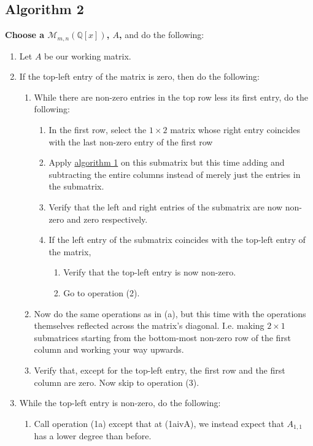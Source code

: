 \documentclass[twocolumn]{article}
\begin{document}
		\subsection{Algorithm 2}\label{sec:algorithm 2}
			\textbf{Choose a $\mathcal{M}_{m,n}(\mathbb{Q}[x])$, $A$,} and do the following:
			\begin{enumerate}
				\item Let $A$ be our working matrix.
				\item If the top-left entry of the matrix is zero, then do the following:
					\begin{enumerate}
						\item While there are non-zero entries in the top row less its first entry, do the following:
						\begin{enumerate}
							\item In the first row, select the $1\times 2$ matrix whose right entry coincides with the last non-zero entry of the first row
							\item Apply \hyperref[sec:algorithm 1]{algorithm 1} on this submatrix but this time adding and subtracting the entire columns instead of merely just the entries in the submatrix.
							\item Verify that the left and right entries of the submatrix are now non-zero and zero respectively.
							\item If the left entry of the submatrix coincides with the top-left entry of the matrix,
							\begin{enumerate}
								\item Verify that the top-left entry is now non-zero.
								\item Go to operation (2).
							\end{enumerate}
						\end{enumerate}
						\item Now do the same operations as in (a), but this time with the operations themselves reflected across the matrix's diagonal. I.e. making $2\times 1$ submatrices starting from the bottom-most non-zero row of the first column and working your way upwards.
						\item Verify that, except for the top-left entry, the first row and the first column are zero. Now skip to operation (3).
					\end{enumerate}
				\item While the top-left entry is non-zero, do the following:
					\begin{enumerate}
						\item Call operation (1a) except that at (1aivA), we instead expect that $A_{1,1}$ has a lower degree than before.

\end{enumerate}
\end{enumerate}
\end{document}

